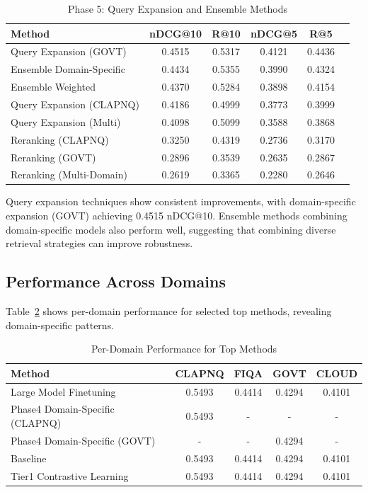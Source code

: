\documentclass[11pt]{article}
\begin{document}
\begin{table}[h]
\centering
\caption{Phase 5: Query Expansion and Ensemble Methods}
\label{tab:phase5}
\small
\begin{tabular}{lccccc}
\toprule
\textbf{Method} & \textbf{nDCG@10} & \textbf{R@10} & \textbf{nDCG@5} & \textbf{R@5} \\
\midrule
Query Expansion (GOVT) & 0.4515 & 0.5317 & 0.4121 & 0.4436 \\
Ensemble Domain-Specific & 0.4434 & 0.5355 & 0.3990 & 0.4324 \\
Ensemble Weighted & 0.4370 & 0.5284 & 0.3898 & 0.4154 \\
Query Expansion (CLAPNQ) & 0.4186 & 0.4999 & 0.3773 & 0.3999 \\
Query Expansion (Multi) & 0.4098 & 0.5099 & 0.3588 & 0.3868 \\
Reranking (CLAPNQ) & 0.3250 & 0.4319 & 0.2736 & 0.3170 \\
Reranking (GOVT) & 0.2896 & 0.3539 & 0.2635 & 0.2867 \\
Reranking (Multi-Domain) & 0.2619 & 0.3365 & 0.2280 & 0.2646 \\
\bottomrule
\end{tabular}
\end{table}

Query expansion techniques show consistent improvements, with domain-specific expansion (GOVT) achieving 0.4515 nDCG@10. Ensemble methods combining domain-specific models also perform well, suggesting that combining diverse retrieval strategies can improve robustness.

\subsection{Performance Across Domains}

Table~\ref{tab:domain_breakdown} shows per-domain performance for selected top methods, revealing domain-specific patterns.

\begin{table}[h]
\centering
\caption{Per-Domain Performance for Top Methods}
\label{tab:domain_breakdown}
\small
\begin{tabular}{lcccc}
\toprule
\textbf{Method} & \textbf{CLAPNQ} & \textbf{FIQA} & \textbf{GOVT} & \textbf{CLOUD} \\
\midrule
Large Model Finetuning & 0.5493 & 0.4414 & 0.4294 & 0.4101 \\
Phase4 Domain-Specific (CLAPNQ) & 0.5493 & - & - & - \\
Phase4 Domain-Specific (GOVT) & - & - & 0.4294 & - \\
Baseline & 0.5493 & 0.4414 & 0.4294 & 0.4101 \\
Tier1 Contrastive Learning & 0.5493 & 0.4414 & 0.4294 & 0.4101 \\
\bottomrule
\end{tabular}
\end{table}
\end{document}
